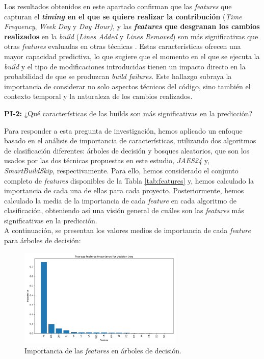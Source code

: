Los resultados obtenidos en este apartado confirman que las \textit{features} que capturan el
\textbf{\textit{timing} en el que se quiere realizar la contribución} (\textit{Time Frequency},
\textit{Week Day} y \textit{Day Hour)}, y las \textbf{\textit{features} que desgranan los cambios
realizados} en la \textit{build} (\textit{Lines Added} y \textit{Lines Removed}) son más
significativas que otras \textit{features} evaluadas en otras técnicas \cite{2}. Estas
características ofrecen una mayor capacidad predictiva, lo que sugiere que el momento en el que
se ejecuta la \textit{build} y el tipo de modificaciones introducidas tienen un impacto directo
en la probabilidad de que se produzcan \textit{build failures}. Este hallazgo subraya la
importancia de considerar no solo aspectos técnicos del código, sino también el contexto temporal
y la naturaleza de los cambios realizados.\\

\begin{mdframed}[backgroundcolor=gray!10,linewidth=0.5pt,roundcorner=1pt]
    \textbf{PI-2:} ¿Qué características de las builds son más significativas en la predicción?
\end{mdframed}

Para responder a esta pregunta de investigación, hemos aplicado un enfoque basado en el análisis
de importancia de características, utilizando dos algoritmos de clasificación diferentes:
árboles de decisión y bosques aleatorios, que son los usados por las dos técnicas propuestas en
este estudio, \textit{JAES24} y, \textit{SmartBuildSkip}, respectivamente. Para ello, hemos
considerado el conjunto completo de \textit{features} disponibles de la Tabla \ref{tab:features}
y, hemos calculado la importancia de cada una de ellas para cada proyecto. Posteriormente, hemos
calculado la media de la importancia de cada \textit{feature} en cada algoritmo de clasificación,
obteniendo así una visión general de cuáles son las \textit{features} más significativas en la
predicción.\\

\noindent A continuación, se presentan los valores medios de importancia de cada \textit{feature}
para árboles de decisión:

\begin{figure}[H]
    \centering
    \includegraphics[width=0.7\textwidth]{images/Average features importance for decision tree.pdf}
    \caption{Importancia de las \textit{features} en árboles de decisión.}
    \label{fig:decision_tree_feature_importance}
\end{figure}

